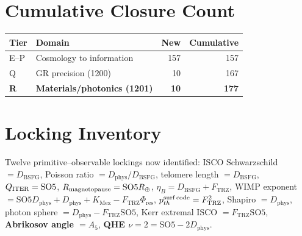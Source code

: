 \documentclass[11pt]{article}
\newcommand{\Ftrz}{F_{\mathrm{TRZ}}}
\newcommand{\Phires}{\Phi_{\mathrm{res}}}
\newcommand{\KMex}{K_{\mathrm{Mex}}}
\newcommand{\Dphys}{D_{\mathrm{phys}}}
\newcommand{\Dbsfg}{D_{\mathrm{BSFG}}}
\newcommand{\SOfive}{\mathrm{SO5}}
\newcommand{\Afive}{A_{5}}
\begin{document}
\section{Cumulative Closure Count}

\begin{tabular}{@{}llrr@{}}
\toprule
Tier & Domain & New & Cumulative \\
\midrule
E--P & Cosmology to information & 157 & 157 \\
Q & GR precision (1200) & 10 & 167 \\
\textbf{R} & \textbf{Materials/photonics (1201)} & \textbf{10} & \textbf{177} \\
\bottomrule
\end{tabular}

\section{Locking Inventory}
Twelve primitive--observable lockings now identified:
ISCO Schwarzschild $=\Dbsfg$,
Poisson ratio $=\Dphys/\Dbsfg$,
telomere length $=\Dbsfg$,
$Q_{\rm ITER}=\SOfive$,
$R_{\rm magnetopause}=\SOfive R_\oplus$,
$\eta_B=\Dbsfg+\Ftrz$,
WIMP exponent $=\SOfive\Dphys+\Dphys+\KMex-\Ftrz\Phires$,
$p_{th}^{\rm surf\,code}=\Ftrz^2$,
Shapiro $=\Dphys$,
photon sphere $=\Dphys-\Ftrz\SOfive$,
Kerr extremal ISCO $=\Ftrz\SOfive$,
\textbf{Abrikosov angle $=\Afive$},
\textbf{QHE $\nu=2=\SOfive-2\Dphys$}.
\end{document}
